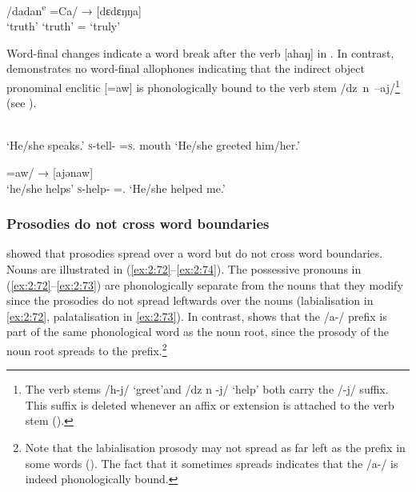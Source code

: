 \ea \label{ex:2:69}
\gll [dedeŋ]  {\ExampleSpace}  {/dadan\textsuperscript{e}}   =Ca/  → \hspace{2pt}  [dɛdɛŋŋa]\\
      ‘truth’   {}   ‘truth’                     ={\ADJ}  {} {}  ‘truly’\\
\z

Word-final changes indicate a word break after the verb [ahaŋ] in . In contrast,  demonstrates no word-final allophones indicating that the indirect object pronominal enclitic [=aw] is phonologically bound to the verb stem \mbox{/dz n –aj/}\footnote{The verb stems /h-j/ ‘greet’and /dz n -j/  ‘help’ both carry the /-j/ suffix. This suffix is deleted whenever an affix or extension is attached to the verb stem ().} (see ).

\ea \label{ex:2:70}
\\
     {‘He/she speaks.’}  \textsc{s}-tell-{\CL}  =\textsc{s}.{\IO}  mouth     {}      {‘He/she greeted him/her.’}\\
\z

\ea \label{ex:2:71}
        =aw/   \hspace{30pt}     →   [ajənaw]\\
       {‘he/she helps’}  \textsc{s}-help-{\CL}  ={\oneS}.{\IO}  {} {}  {‘He/she helped me.’}\\
\z

\subsubsection{Prosodies do not cross word boundaries}\label{sec:2.6.1.3}

\citet{Bow1997c} showed that prosodies spread over a word but do not cross word boundaries. Nouns are illustrated in (\ref{ex:2:72}--\ref{ex:2:74}). The possessive pronouns in (\ref{ex:2:72}--\ref{ex:2:73}) are phonologically separate from the nouns that they modify since the prosodies do not spread leftwards over the nouns (labialisation in \ref{ex:2:72}, palatalisation in \ref{ex:2:73}). In contrast,  shows that the /a-/ prefix is part of the same phonological word as the noun root, since the prosody of the noun root spreads to the prefix.\footnote{Note that the labialisation prosody may not spread as far left as the prefix in some words (). The fact that it sometimes spreads indicates that the /a-/ is indeed phonologically bound. } 
 


